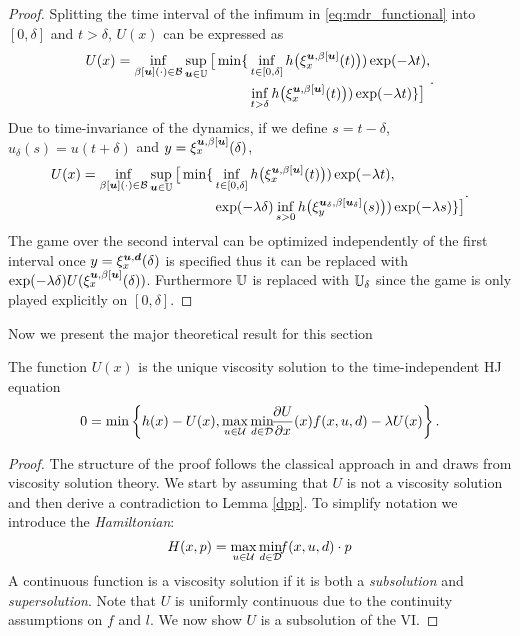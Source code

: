\begin{for_journal}
\begin{proof}
Splitting the time interval of the infimum in \eqref{eq:mdr_functional} into $[0,\delta]$ and $t>\delta$, $U(x)$ can be expressed as
%
\begin{equation}
\begin{split}{}{}{}
U(x) =
\inf_{\beta[\bm{u}](\cdot) \in \mathcal{B}} \sup_{\bm{u} \in \mathbb{U}} 
\big [\min\{&\inf_{t \in [0, \delta]} h\big(\xi_{x}^{\bm{u},\beta[\bm{u}]}(t)\big))\exp(-\lambda  t),\\ &\inf_{t > \delta} h\big(\xi_{x}^{\bm{u},\beta[\bm{u}]}(t)\big))\exp(-\lambda  t)\}
\big ]
\end{split}.
\end{equation}
%
Due to time-invariance of the dynamics, if we define $s=t-\delta$, $u_\delta(s)=u(t+\delta)$ and $y=\xi_{x}^{\bm{u},\beta[\bm{u}]}(\delta)$,
%
\begin{equation}
\begin{split}
U(x) = 
\inf_{\beta[\bm{u}](\cdot) \in \mathcal{B}} \sup_{\bm{u} \in \mathbb{U}} 
\big [\min\{&\inf_{t \in [0, \delta]} h\big(\xi_{x}^{\bm{u},\beta[\bm{u}]}(t)\big))\exp(-\lambda  t), \\ &\exp(-\lambda \delta) \inf_{s > 0} h\big(\xi_{y}^{\bm{u}_\delta,\beta[\bm{u}_\delta]}(s)\big))\exp(-\lambda s)\}
\big ]
\end{split}.
\end{equation}
%
The game over the second interval can be optimized independently of the first interval once $y=\xi_{x}^{\bm{u},\bm{d}}(\delta)$ is specified thus it can be replaced with $\exp(-\lambda \delta)U(\xi_{x}^{\bm{u},\beta[\bm{u}]}(\delta))$. Furthermore $\mathbb{U}$ is replaced with $\mathbb{U}_\delta$ since the game is only played explicitly on $[0,\delta]$.
\end{proof}

Now we present the major theoretical result for this section

\begin{theorem}
The function $U(x)$ is the unique viscosity solution to the time-independent HJ equation
%
\begin{equation}\label{eq:HJI_lambda}
    0 = \min\left\{h(x)-U(x), \max_{u\in\mathcal{U}} \min_{ d\in\mathcal{D}} \!\!\frac{\partial U}{\partial x}(x) f(x,u, d) - \lambda U(x)\right\}.
\end{equation}
%
\end{theorem}

\begin{proof}
The structure of the proof follows the classical approach in \cite{Evans1984} and draws from viscosity solution theory. We start by assuming that $U$ is not a viscosity solution and then derive a contradiction to Lemma \ref{dpp}. To simplify notation we introduce the \emph{Hamiltonian}:
\begin{equation}\label{eq:hamiltonian}
H(x,p) = \max_{u\in\mathcal{U}} \min_{ d\in\mathcal{D}} \!\! f(x,u,d)\cdot p
\end{equation}
A continuous function is a viscosity solution if it is both a \emph{subsolution} and \emph{supersolution}. Note that $U$ is uniformly continuous due to the continuity assumptions on $f$ and $l$. We now show $U$ is a subsolution of the VI.


\end{proof}
\end{for_journal}
